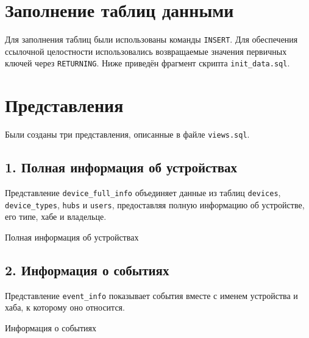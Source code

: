 \documentclass[oneside,a4paper,14pt]{extarticle}
\begin{document}
\section*{Заполнение таблиц данными}

Для заполнения таблиц были использованы команды \texttt{INSERT}. Для обеспечения ссылочной целостности использовались возвращаемые значения первичных ключей через \texttt{RETURNING}. Ниже приведён фрагмент скрипта \texttt{init\_data.sql}.

\section*{Представления}

Были созданы три представления, описанные в файле \texttt{views.sql}.

\subsection*{1. Полная информация об устройствах}

Представление \texttt{device\_full\_info} объединяет данные из таблиц \texttt{devices}, \\
\texttt{device\_types}, \texttt{hubs} и \texttt{users}, предоставляя полную информацию об устройстве, его типе, хабе и владельце.

\begin{table}[H]
  \centering
  \caption{Полная информация об устройствах}
  \label{tab:device_full_info}
\end{table}

\subsection*{2. Информация о событиях}

Представление \texttt{event\_info} показывает события вместе с именем устройства и хаба, к которому оно относится.

\begin{table}[H]
  \centering
  \footnotesize
  \caption{Информация о событиях}
  \label{tab:event_info}
\end{table}
\end{document}

